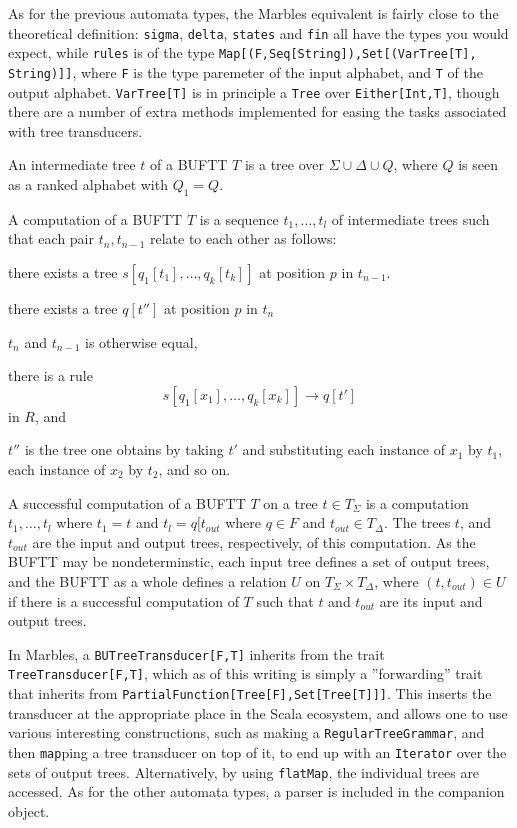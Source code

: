 As for the previous automata types, the Marbles equivalent is fairly close
to the theoretical definition: \texttt{sigma}, \texttt{delta},
\texttt{states} and \texttt{fin} all have the types you would expect, while
\texttt{rules} is of the type \texttt{Map[(F,Seq[String]),Set[(VarTree[T],
  String)]]}, where \texttt{F} is the type paremeter of the input alphabet,
and \texttt{T} of the output alphabet. \texttt{VarTree[T]} is in principle
a \texttt{Tree} over \texttt{Either[Int,T]}, though there are a number of
extra methods implemented for easing the tasks associated with tree
transducers. 

An intermediate tree $t$ of a BUFTT $T$ is a tree over $\Sigma \cup \Delta
\cup Q$, where $Q$ is seen as a ranked alphabet with $Q_1 = Q$. 

A computation of a BUFTT $T$ is a sequence $t_1,\ldots,t_l$ of intermediate
trees such that each pair $t_n, t_{n-1}$ relate to each other as follows:
\begin{compactitem}
\item there exists a tree $s[q_1[t_1],\ldots,q_k[t_k]]$ at position $p$ in
$t_{n-1}$.
\item there exists a tree $q[t'']$ at position $p$ in $t_n$
\item $t_n$ and $t_{n-1}$ is otherwise equal,
\item there is a rule $$s[q_1[x_1],\ldots,q_k[x_k]] \rightarrow q[t']$$ in
$R$, and
\item $t''$ is the tree one obtains by taking $t'$ and substituting each
instance of $x_1$ by $t_1$, each instance of $x_2$ by $t_2$, and so on.
\end{compactitem}

A successful computation of a BUFTT $T$ on a tree $t \in T_\Sigma$ is a
computation $t_1,\ldots,t_l$ where $t_1 = t$ and $t_l = q[t_{out}$ where $q
\in F$ and $t_{out} \in T_\Delta$. The trees $t$, and $t_{out}$ are the
input and output trees, respectively, of this computation. As the BUFTT may
be nondeterminstic, each input tree defines a set of output trees, and the
BUFTT as a whole defines a relation $U$ on $T_\Sigma \times T_\Delta$, where
$(t, t_{out}) \in U$ if there is a successful computation of $T$ such that
$t$ and $t_{out}$ are its input and output trees.

In Marbles, a \texttt{BUTreeTransducer[F,T]} inherits from the trait
\texttt{TreeTransducer[F,T]}, which as of this writing is simply a
''forwarding'' trait that inherits from
\texttt{PartialFunction[Tree[F],Set[Tree[T]]]}. This inserts the transducer
at the appropriate place in the Scala ecosystem, and allows one to use
various interesting constructions, such as making a
\texttt{RegularTreeGrammar}, and then \texttt{map}ping a tree transducer on
top of it, to end up with an \texttt{Iterator} over the sets of output
trees. Alternatively, by using \texttt{flatMap}, the individual trees are
accessed. As for the other automata types, a parser is included in the
companion object.

